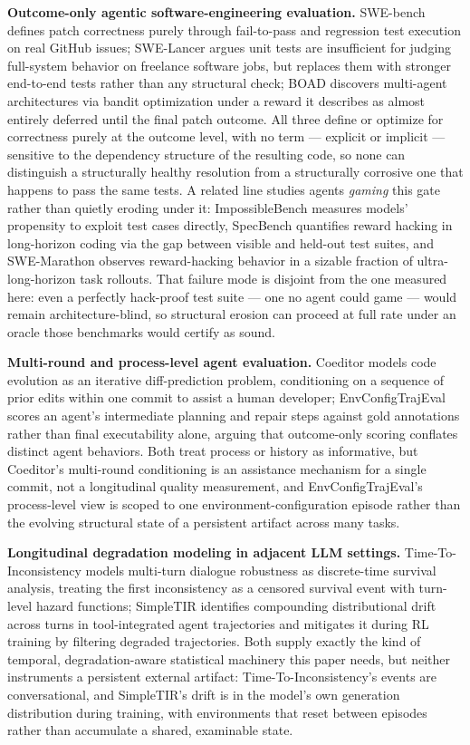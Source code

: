 \documentclass[11pt]{article}
\begin{document}
\textbf{Outcome-only agentic software-engineering evaluation.} SWE-bench defines patch correctness purely through fail-to-pass and regression test execution on real GitHub issues; SWE-Lancer argues unit tests are insufficient for judging full-system behavior on freelance software jobs, but replaces them with stronger end-to-end tests rather than any structural check; BOAD discovers multi-agent architectures via bandit optimization under a reward it describes as almost entirely deferred until the final patch outcome. All three define or optimize for correctness purely at the outcome level, with no term --- explicit or implicit --- sensitive to the dependency structure of the resulting code, so none can distinguish a structurally healthy resolution from a structurally corrosive one that happens to pass the same tests. A related line studies agents \emph{gaming} this gate rather than quietly eroding under it: ImpossibleBench measures models' propensity to exploit test cases directly, SpecBench quantifies reward hacking in long-horizon coding via the gap between visible and held-out test suites, and SWE-Marathon observes reward-hacking behavior in a sizable fraction of ultra-long-horizon task rollouts. That failure mode is disjoint from the one measured here: even a perfectly hack-proof test suite --- one no agent could game --- would remain architecture-blind, so structural erosion can proceed at full rate under an oracle those benchmarks would certify as sound.

\textbf{Multi-round and process-level agent evaluation.} Coeditor models code evolution as an iterative diff-prediction problem, conditioning on a sequence of prior edits within one commit to assist a human developer; EnvConfigTrajEval scores an agent's intermediate planning and repair steps against gold annotations rather than final executability alone, arguing that outcome-only scoring conflates distinct agent behaviors. Both treat process or history as informative, but Coeditor's multi-round conditioning is an assistance mechanism for a single commit, not a longitudinal quality measurement, and EnvConfigTrajEval's process-level view is scoped to one environment-configuration episode rather than the evolving structural state of a persistent artifact across many tasks.

\textbf{Longitudinal degradation modeling in adjacent LLM settings.} Time-To-Inconsistency models multi-turn dialogue robustness as discrete-time survival analysis, treating the first inconsistency as a censored survival event with turn-level hazard functions; SimpleTIR identifies compounding distributional drift across turns in tool-integrated agent trajectories and mitigates it during RL training by filtering degraded trajectories. Both supply exactly the kind of temporal, degradation-aware statistical machinery this paper needs, but neither instruments a persistent external artifact: Time-To-Inconsistency's events are conversational, and SimpleTIR's drift is in the model's own generation distribution during training, with environments that reset between episodes rather than accumulate a shared, examinable state.
\end{document}
